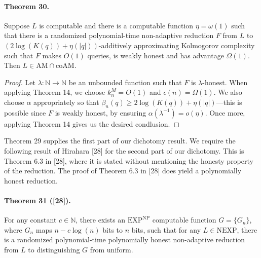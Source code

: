 \documentclass[10pt,a4paper]{article}
\begin{document}
\paragraph{Theorem 30.} Suppose $L$ is computable and there is a computable function $\eta=\omega(1)$ such that there is a randomized polynomial-time non-adaptive reduction $F$ from $L$ to $(2\log(K(q))+\eta(|q|))$-additively approximating Kolmogorov complexity such that $F$ makes $O(1)$ queries, is weakly honest and has advantage $\Omega(1)$. Then $L\in\mathrm{AM}\cap\mathrm{coAM}$.
\begin{proof}Let $\lambda:\mathbb N\to\mathbb N$ be an unbounded function such that $F$ is $\lambda$-honest. When applying Theorem 14, we choose $k_n^M=O(1)$ and $\epsilon(n)=\Omega(1)$. We also choose $\alpha$ appropriately so that $\beta_n(q)\ge2\log(K(q))+\eta(|q|)$---this is possible since $F$ is weakly honest, by ensuring $\alpha(\lambda^{-1})=o(\eta)$. Once more, applying Theorem 14 gives us the desired condlusion.\end{proof}
Theorem 29 supplies the first part of our dichotomy result. We require the following result of Hirahara [28] for the second part of our dichotomy. This is Theorem 6.3 in [28], where it is stated without mentioning the honesty property of the reduction. The proof of Theorem 6.3 in [28] does yield a polynomially honest reduction.
\paragraph{Theorem 31 ([28]).} For any constant $c\in\mathbb N$, there exists an $\mathrm{EXP}^{\mathrm{NP}}$ computable function $G=\{G_n\}$, where $G_n$ maps $n-c\log(n)$ bits to $n$ bits, such that for any $L\in\mathrm{NEXP}$, there is a randomized polynomial-time polynomially honest non-adaptive reduction from $L$ to distinguishing $G$ from uniform.
\end{document}
